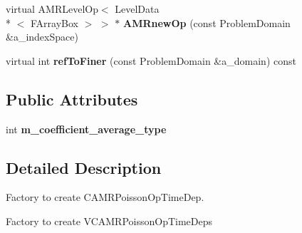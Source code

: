 \begin{DoxyCompactItemize}
\item 
\hypertarget{class_v_c_a_m_r_poisson_op_time_dep_factory_aafa48c968487546d08a5245e474b4795}{virtual A\-M\-R\-Level\-Op$<$ Level\-Data\\*
$<$ F\-Array\-Box $>$ $>$ $\ast$ {\bfseries A\-M\-Rnew\-Op} (const Problem\-Domain \&a\-\_\-index\-Space)}\label{class_v_c_a_m_r_poisson_op_time_dep_factory_aafa48c968487546d08a5245e474b4795}

\item 
\hypertarget{class_v_c_a_m_r_poisson_op_time_dep_factory_a27ba557e7bc334fbb5f6189f3063a97e}{virtual int {\bfseries ref\-To\-Finer} (const Problem\-Domain \&a\-\_\-domain) const }\label{class_v_c_a_m_r_poisson_op_time_dep_factory_a27ba557e7bc334fbb5f6189f3063a97e}

\end{DoxyCompactItemize}
\subsection*{Public Attributes}
\begin{DoxyCompactItemize}
\item 
\hypertarget{class_v_c_a_m_r_poisson_op_time_dep_factory_a599e43d05be9ff38770323068e582855}{int {\bfseries m\-\_\-coefficient\-\_\-average\-\_\-type}}\label{class_v_c_a_m_r_poisson_op_time_dep_factory_a599e43d05be9ff38770323068e582855}

\end{DoxyCompactItemize}


\subsection{Detailed Description}
Factory to create C\-A\-M\-R\-Poisson\-Op\-Time\-Dep. 

Factory to create V\-C\-A\-M\-R\-Poisson\-Op\-Time\-Deps 

